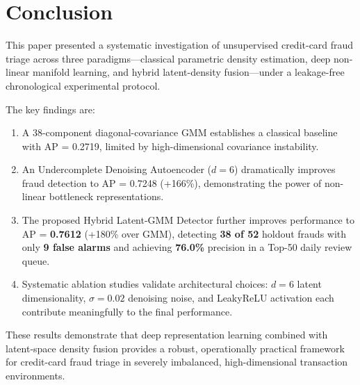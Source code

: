 \documentclass[conference,10pt]{IEEEtran}
\begin{document}
\section{Conclusion}
\label{sec:conclusion}

This paper presented a systematic investigation of unsupervised credit-card
fraud triage across three paradigms---classical parametric density estimation,
deep non-linear manifold learning, and hybrid latent-density fusion---under a
leakage-free chronological experimental protocol.

The key findings are:
\begin{enumerate}[leftmargin=*]
\item A 38-component diagonal-covariance GMM establishes a classical baseline
      with AP = 0.2719, limited by high-dimensional covariance instability.
\item An Undercomplete Denoising Autoencoder ($d = 6$) dramatically improves
      fraud detection to AP = 0.7248 (+166\%), demonstrating the power of
      non-linear bottleneck representations.
\item The proposed Hybrid Latent-GMM Detector further improves performance to
      AP = \textbf{0.7612} (+180\% over GMM), detecting \textbf{38 of 52}
      holdout frauds with only \textbf{9 false alarms} and achieving
      \textbf{76.0\%} precision in a Top-50 daily review queue.
\item Systematic ablation studies validate architectural choices:
      $d = 6$ latent dimensionality, $\sigma = 0.02$ denoising noise, and
      LeakyReLU activation each contribute meaningfully to the final
      performance.
\end{enumerate}

These results demonstrate that deep representation learning combined with
latent-space density fusion provides a robust, operationally practical
framework for credit-card fraud triage in severely imbalanced, high-dimensional
transaction environments.
\end{document}
